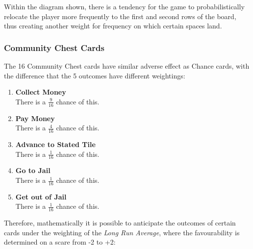 \documentclass[12pt]{article}
\begin{document}
Within the diagram shown, there is a tendency for the game to probabilistically relocate the player more frequently to the first and second rows of the board, thus creating another weight for frequency on which certain spaces land.

\subsubsection{Community Chest Cards}
The 16 Community Chest cards have similar adverse effect as Chance cards, with the difference that the 5 outcomes have different weightings:
\begin{enumerate}
  \item \textbf{Collect Money} \hfill\\
  There is a $\frac{9}{16}$ chance of this.
  \item \textbf{Pay Money} \hfill\\
  There is a $\frac{4}{16}$ chance of this.
  \item \textbf{Advance to Stated Tile} \hfill\\
  There is a $\frac{1}{16}$ chance of this.
  \item \textbf{Go to Jail} \hfill\\
  There is a $\frac{1}{16}$ chance of this.
  \item \textbf{Get out of Jail} \hfill\\
  There is a $\frac{1}{16}$ chance of this.
\end{enumerate}
Therefore, mathematically it is possible to anticipate the outcomes of certain cards under the weighting of the \emph{Long Run Average}, where the favourability is determined on a scare from -2 to +2:
\end{document}
